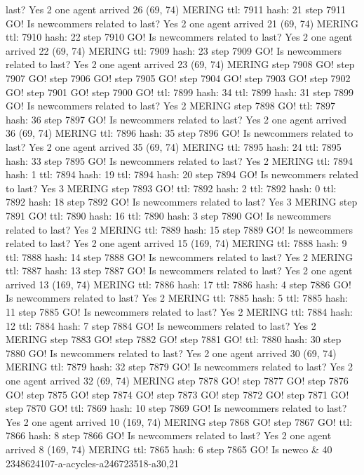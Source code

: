 last? Yes 2 one agent arrived 26 (69, 74) MERING ttl: 7911 hash: 21 step 7911 GO! Is newcommers related to last? Yes 2 one agent arrived 21 (69, 74) MERING ttl: 7910 hash: 22 step 7910 GO! Is newcommers related to last? Yes 2 one agent arrived 22 (69, 74) MERING ttl: 7909 hash: 23 step 7909 GO! Is newcommers related to last? Yes 2 one agent arrived 23 (69, 74) MERING step 7908 GO! step 7907 GO! step 7906 GO! step 7905 GO! step 7904 GO! step 7903 GO! step 7902 GO! step 7901 GO! step 7900 GO! ttl: 7899 hash: 34 ttl: 7899 hash: 31 step 7899 GO! Is newcommers related to last? Yes 2 MERING step 7898 GO! ttl: 7897 hash: 36 step 7897 GO! Is newcommers related to last? Yes 2 one agent arrived 36 (69, 74) MERING ttl: 7896 hash: 35 step 7896 GO! Is newcommers related to last? Yes 2 one agent arrived 35 (69, 74) MERING ttl: 7895 hash: 24 ttl: 7895 hash: 33 step 7895 GO! Is newcommers related to last? Yes 2 MERING ttl: 7894 hash: 1 ttl: 7894 hash: 19 ttl: 7894 hash: 20 step 7894 GO! Is newcommers related to last? Yes 3 MERING step 7893 GO! ttl: 7892 hash: 2 ttl: 7892 hash: 0 ttl: 7892 hash: 18 step 7892 GO! Is newcommers related to last? Yes 3 MERING step 7891 GO! ttl: 7890 hash: 16 ttl: 7890 hash: 3 step 7890 GO! Is newcommers related to last? Yes 2 MERING ttl: 7889 hash: 15 step 7889 GO! Is newcommers related to last? Yes 2 one agent arrived 15 (169, 74) MERING ttl: 7888 hash: 9 ttl: 7888 hash: 14 step 7888 GO! Is newcommers related to last? Yes 2 MERING ttl: 7887 hash: 13 step 7887 GO! Is newcommers related to last? Yes 2 one agent arrived 13 (169, 74) MERING ttl: 7886 hash: 17 ttl: 7886 hash: 4 step 7886 GO! Is newcommers related to last? Yes 2 MERING ttl: 7885 hash: 5 ttl: 7885 hash: 11 step 7885 GO! Is newcommers related to last? Yes 2 MERING ttl: 7884 hash: 12 ttl: 7884 hash: 7 step 7884 GO! Is newcommers related to last? Yes 2 MERING step 7883 GO! step 7882 GO! step 7881 GO! ttl: 7880 hash: 30 step 7880 GO! Is newcommers related to last? Yes 2 one agent arrived 30 (69, 74) MERING ttl: 7879 hash: 32 step 7879 GO! Is newcommers related to last? Yes 2 one agent arrived 32 (69, 74) MERING step 7878 GO! step 7877 GO! step 7876 GO! step 7875 GO! step 7874 GO! step 7873 GO! step 7872 GO! step 7871 GO! step 7870 GO! ttl: 7869 hash: 10 step 7869 GO! Is newcommers related to last? Yes 2 one agent arrived 10 (169, 74) MERING step 7868 GO! step 7867 GO! ttl: 7866 hash: 8 step 7866 GO! Is newcommers related to last? Yes 2 one agent arrived 8 (169, 74) MERING ttl: 7865 hash: 6 step 7865 GO! Is newco
&
40
\\
2348624107-a-acycles-a246723518-a30,21
